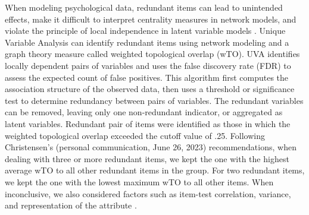 \documentclass[
  12pt,
  twoside,
  openright,
  a4paper,
  chapter=TITLE,
  section=TITLE,
  brazil]{abntex2}
\begin{document}
When modeling psychological data, redundant items can lead to unintended
effects, make it difficult to interpret centrality measures in network
models, and violate the principle of local independence in latent
variable models \autocite{christensen2023}. Unique Variable Analysis
\autocite[UVA,][]{christensen2023} can identify redundant items using
network modeling and a graph theory measure called weighted topological
overlap (wTO). UVA identifies locally dependent pairs of variables and
uses the false discovery rate (FDR) to assess the expected count of
false positives. This algorithm first computes the association structure
of the observed data, then uses a threshold or significance test to
determine redundancy between pairs of variables. The redundant variables
can be removed, leaving only one non-redundant indicator, or aggregated
as latent variables. Redundant pair of items were identified as those in
which the weighted topological overlap exceeded the cutoff value of .25.
Following Christensen's (personal communication, June 26, 2023)
recommendations, when dealing with three or more redundant items, we
kept the one with the highest average wTO to all other redundant items
in the group. For two redundant items, we kept the one with the lowest
maximum wTO to all other items. When inconclusive, we also considered
factors such as item-test correlation, variance, and representation of
the attribute \autocite{christensen2020a}.
\end{document}
